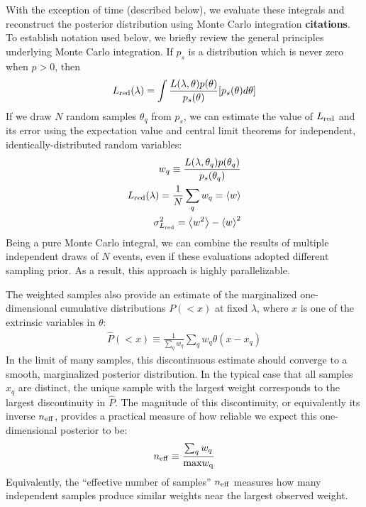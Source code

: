 \documentclass[twocolumn,prd,nofootinbib]{revtex4}
\begin{document}
With the exception of time (described below), we evaluate these integrals and reconstruct the posterior distribution using Monte Carlo integration
\textbf{citations}.   To establish notation used below, we briefly review the general principles  underlying Monte Carlo
integration.  If $p_s$ is a distribution which is never zero when $p>0$, then 
\begin{eqnarray}
L_{\rm red}(\lambda) = \int \frac{L(\lambda,\theta) p(\theta)}{p_s(\theta)} [p_s(\theta) d\theta]
\end{eqnarray}
% 
If we draw $N$ random samples $\theta_q$ from $p_s$, we can estimate the value of $L_{\rm red}$ and its error using the
expectation value and central limit theorems for independent, identically-distributed random variables:
\begin{eqnarray}
w_q \equiv \frac{L(\lambda,\theta_q) p(\theta_q)}{p_s(\theta_q)} \\
L_{\rm red}(\lambda) = \frac{1}{N} \sum_q w_q = \left<w\right> \\
\sigma_{L_{\rm red}}^2 = \left<w^2\right> - \left<w\right>^2
\end{eqnarray}
Being a pure Monte Carlo integral, we can  combine the results of multiple independent draws of $N$ events, even if these
evaluations adopted different sampling prior.  As a result, this approach is highly parallelizable.  


The weighted samples also provide an estimate of the marginalized one-dimensional cumulative distributions $P(<x)$ at
fixed $\lambda$, where $x$ is one of the extrinsic variables in $\theta$:
\begin{eqnarray}
\hat{P}(<x) \equiv \frac{1}{\sum_q w_q} \sum_q w_q \theta(x-x_q)
\end{eqnarray}
In the limit of many samples, this discontinuous estimate should converge to a smooth, marginalized posterior distribution.  
In the typical case that all samples $x_q$ are distinct, the unique sample with the largest weight corresponds to the
largest discontinuity in $\hat{P}$.  The magnitude of this discontinuity, or equivalently its inverse $n_{\rm eff}$,
provides a practical measure of how reliable we expect this one-dimensional posterior to be:
\begin{eqnarray}
n_{\rm eff} \equiv \frac{\sum_q w_q}{\text{max} w_{\rm q}}
\end{eqnarray}
Equivalently, the ``effective number of samples'' $n_{\rm eff}$ measures how many independent samples produce similar
weights near the largest observed weight.  
\end{document}
